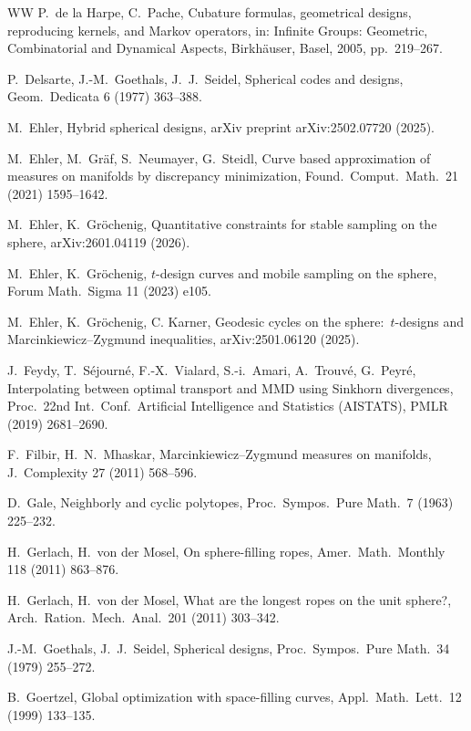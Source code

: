 \documentclass[12pt]{article}
\theoremstyle{plain}
\theoremstyle{definition}
\theoremstyle{remark}
\begin{document}
\begin{thebibliography}{WW}
P.\ de la Harpe, C.\ Pache,
Cubature formulas, geometrical designs, reproducing kernels, and Markov operators,
in: Infinite Groups: Geometric, Combinatorial and Dynamical Aspects,
Birkh\"auser, Basel, 2005, pp.\ 219--267.

P.\ Delsarte, J.-M.\ Goethals, J.\ J.\ Seidel,
Spherical codes and designs,
Geom.\ Dedicata 6 (1977) 363--388.

M.\ Ehler,
Hybrid spherical designs,
arXiv preprint arXiv:2502.07720 (2025).

M.\ Ehler, M.\ Gr\"af, S.\ Neumayer, G.\ Steidl,
Curve based approximation of measures on manifolds by discrepancy minimization,
Found.\ Comput.\ Math.\ 21 (2021) 1595--1642.

M.\ Ehler, K.\ Gr\"ochenig,
Quantitative constraints for stable sampling on the sphere,
arXiv:2601.04119 (2026).

M.\ Ehler, K.\ Gr\"ochenig,
$t$-design curves and mobile sampling on the sphere,
Forum Math.\ Sigma 11 (2023) e105.

M.\ Ehler, K.\ Gr\"ochenig, C. Karner,
Geodesic cycles on the sphere:\ $t$-designs and Marcinkiewicz--Zygmund inequalities,
arXiv:2501.06120 (2025).

J.\ Feydy, T.\ S{\'e}journ{\'e}, F.-X.\ Vialard, S.-i.\ Amari, A.\ Trouv{\'e}, G.\ Peyr{\'e},
Interpolating between optimal transport and MMD using Sinkhorn divergences,
Proc.\ 22nd Int.\ Conf.\ Artificial Intelligence and Statistics (AISTATS), PMLR (2019) 2681--2690.


F.\ Filbir, H.\ N.\ Mhaskar,
Marcinkiewicz--Zygmund measures on manifolds,
J.\ Complexity 27 (2011) 568--596.

D.\ Gale,
Neighborly and cyclic polytopes,
Proc.\ Sympos.\ Pure Math.\ 7 (1963) 225--232.

H.\ Gerlach, H.\ von der Mosel,
On sphere-filling ropes,
Amer.\ Math.\ Monthly 118 (2011) 863--876.

H.\ Gerlach, H.\ von der Mosel,
What are the longest ropes on the unit sphere?,
Arch.\ Ration.\ Mech.\ Anal.\ 201 (2011) 303--342.

J.-M.\ Goethals, J.\ J.\ Seidel,
Spherical designs,
Proc.\ Sympos.\ Pure Math.\ 34 (1979) 255--272.

B.\ Goertzel,
Global optimization with space-filling curves,
Appl.\ Math.\ Lett.\ 12 (1999) 133--135.


\end{thebibliography}
\end{document}

